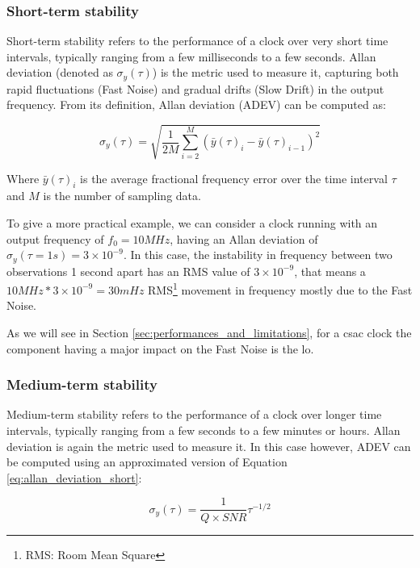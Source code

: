 \subsubsection{Short-term stability}

Short-term stability refers to the performance of a clock over very short time intervals, typically ranging from a few milliseconds to a few seconds.
Allan deviation (denoted as $\sigma_y(\tau)$) is the metric used to measure it, capturing both rapid fluctuations (Fast Noise) and gradual drifts (Slow Drift) in the output frequency.
From its definition, Allan deviation (ADEV) can be computed as:

\begin{equation}
  \sigma_y(\tau) = \sqrt{\frac{1}{2M} \sum_{i=2}^{M} (\bar{y}(\tau)_{i} - \bar{y}(\tau)_{i-1})^2}
  \label{eq:allan_deviation_short}
\end{equation}

Where $\bar{y}(\tau)_{i}$ is the average fractional frequency error over the time interval $\tau$ and $M$ is the number of sampling data.

To give a more practical example, we can consider a clock running with an output frequency of $f_0 = 10MHz$, having an Allan deviation of $\sigma_y(\tau=1s) = 3 \times 10^{-9}$.
In this case, the instability in frequency between two observations 1 second apart has an RMS value of $3 \times 10^{-9}$, that means a $10MHz * 3 \times 10^{-9} = 30mHz$ RMS\footnote{RMS: Room Mean Square} movement in frequency mostly due to the Fast Noise.

As we will see in Section \ref{sec:performances_and_limitations}, for a \acrshort{csac} clock the component having a major impact on the Fast Noise is the \acrfull{lo}.


\subsubsection{Medium-term stability}

Medium-term stability refers to the performance of a clock over longer time intervals, typically ranging from a few seconds to a few minutes or hours.
Allan deviation is again the metric used to measure it.
In this case however, ADEV can be computed using an approximated version of Equation \ref{eq:allan_deviation_short}:

\begin{equation}
  \sigma_y(\tau) = \frac{1}{Q \times SNR} \tau^{-1/2}
  \label{eq:allan_deviation_medium}
\end{equation}

